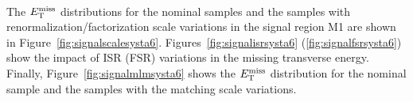\paragraph{}





The $E_{\mathrm{T}}^{\mathrm{miss}}$ distributions for the nominal samples and the samples with renormalization/factorization scale variations in the signal region M1 are shown in Figure~\ref{fig:signalscalesysta6}.
Figures~\ref{fig:signalisrsysta6} (\ref{fig:signalfsrsysta6}) show the impact of ISR (FSR) variations in the missing transverse energy.
Finally, Figure~\ref{fig:signalmlmsysta6} shows the $E_{\mathrm{T}}^{\mathrm{miss}}$ distribution for the nominal sample and the samples with the matching scale variations.

